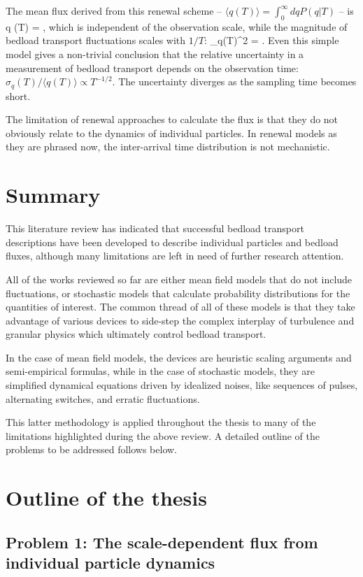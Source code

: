 The mean flux derived from this renewal scheme -- $\langle q (T)\rangle = \int_0^\infty dq P(q|T)$ -- is
\be \langle q (T) \rangle = \Lambda, \ee
which is independent of the observation scale, while the magnitude of bedload transport fluctuations scales with $1/T$: 
\be \sigma_q(T)^2 = .\ee
Even this simple model gives a non-trivial conclusion that the relative uncertainty in a measurement of bedload transport depends on the observation time: $\sigma_q(T)/\langle q(T) \rangle \propto T^{-1/2}.$ The uncertainty diverges as the sampling time becomes short.

The limitation of renewal approaches to calculate the flux is that they do not obviously relate to the dynamics of individual particles. In renewal models as they are phrased now, the inter-arrival time distribution is not mechanistic.

\section{Summary}

This literature review has indicated that successful bedload transport descriptions have been developed to describe individual particles and bedload fluxes, although many limitations are left in need of further research attention.

All of the works reviewed so far are either mean field models that do not include fluctuations, or stochastic models that calculate probability distributions for the quantities of interest.
The common thread of all of these models is that they take advantage of various devices to side-step the complex interplay of turbulence and granular physics which ultimately control bedload transport.

In the case of mean field models, the devices are heuristic scaling arguments and semi-empirical formulas, while in the case of stochastic models, they are simplified dynamical equations driven by idealized noises, like sequences of pulses, alternating switches, and erratic fluctuations.

This latter methodology is applied throughout the thesis to many of the limitations highlighted during the above review. A detailed outline of the problems to be addressed follows below.

\section{Outline of the thesis}
\subsection{Problem 1: The scale-dependent flux from individual particle dynamics}

